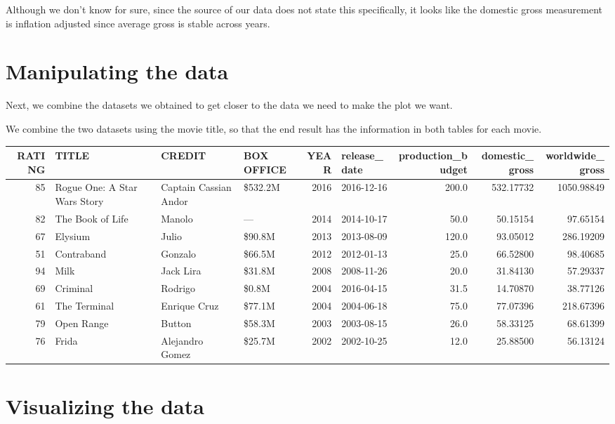 \documentclass[12pt,]{book}
\theoremstyle{definition}
\theoremstyle{definition}
\theoremstyle{definition}
\theoremstyle{remark}
\begin{document}
Although we don't know for sure, since the source of our data does not
state this specifically, it looks like the domestic gross measurement is
inflation adjusted since average gross is stable across years.

\section{Manipulating the data}\label{manipulating-the-data}

Next, we combine the datasets we obtained to get closer to the data we
need to make the plot we want.

We combine the two datasets using the movie title, so that the end
result has the information in both tables for each movie.

\begin{tabular}{r|l|l|l|r|l|r|r|r}
\hline
RATING & TITLE & CREDIT & BOX OFFICE & YEAR & release\_date & production\_budget & domestic\_gross & worldwide\_gross\\
\hline
85 & Rogue One: A Star Wars Story & Captain Cassian Andor & \$532.2M & 2016 & 2016-12-16 & 200.0 & 532.17732 & 1050.98849\\
\hline
82 & The Book of Life & Manolo & — & 2014 & 2014-10-17 & 50.0 & 50.15154 & 97.65154\\
\hline
67 & Elysium & Julio & \$90.8M & 2013 & 2013-08-09 & 120.0 & 93.05012 & 286.19209\\
\hline
51 & Contraband & Gonzalo & \$66.5M & 2012 & 2012-01-13 & 25.0 & 66.52800 & 98.40685\\
\hline
94 & Milk & Jack Lira & \$31.8M & 2008 & 2008-11-26 & 20.0 & 31.84130 & 57.29337\\
\hline
69 & Criminal & Rodrigo & \$0.8M & 2004 & 2016-04-15 & 31.5 & 14.70870 & 38.77126\\
\hline
61 & The Terminal & Enrique Cruz & \$77.1M & 2004 & 2004-06-18 & 75.0 & 77.07396 & 218.67396\\
\hline
79 & Open Range & Button & \$58.3M & 2003 & 2003-08-15 & 26.0 & 58.33125 & 68.61399\\
\hline
76 & Frida & Alejandro Gomez & \$25.7M & 2002 & 2002-10-25 & 12.0 & 25.88500 & 56.13124\\
\hline
\end{tabular}

\section{Visualizing the data}\label{visualizing-the-data}
\end{document}
